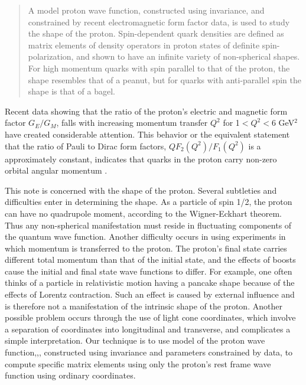 \maketitle
\begin{abstract}
A model proton wave function, constructed using \poinc invariance, and
constrained by recent electromagnetic form factor data, is used to study
the shape of the proton. Spin-dependent quark densities are defined as
matrix elements of density operators in 
proton states of definite spin-polarization, and shown to have 
an infinite 
variety of non-spherical shapes. For high momentum quarks with spin parallel
to that of the proton, the shape resembles that of a peanut,
but  for quarks with anti-parallel spin the shape is that of a bagel.
\end{abstract}

\vskip0.5cm

Recent data \cite {Jones:1999rz,Gayou:2001qd} 
showing that  the ratio of the proton's electric and magnetic form
factor $G_E/G_M$, falls with increasing momentum transfer $Q^2$ for 
1$<Q^2<6 $ GeV$^2$
have created considerable attention. This behavior  or the equivalent    
statement 
 that  the ratio of Pauli
to Dirac form factors, $QF_2(Q^2)/F_1(Q^2)$ is a approximately constant,
indicates that quarks in the proton carry non-zero orbital angular momentum
\cite{ralston,Braun:2001tj,Miller:2002qb,Ji}.

This note is concerned with 
the shape of the proton. 
Several   subtleties and difficulties enter in determining the shape.
 As a particle of spin
1/2, the proton can have no quadrupole moment, 
according to the Wigner-Eckhart theorem.  Thus any non-spherical 
manifestation must reside in fluctuating components of the quantum wave
function. Another difficulty occurs in using experiments
in which momentum is transferred to the proton. The proton's final state  
 carries different total momentum than that of the initial
state, and the effects of boosts cause the initial and final state
wave functions to differ. For example, one often thinks  of a particle
in relativistic motion having a pancake shape because of the effects
of Lorentz contraction. Such an effect is caused by external influence
and is therefore not a manifestation of the intrinsic shape
of the proton. Another possible problem occurs through the use of 
light cone coordinates, which
  involve a separation of coordinates into
longitudinal and transverse, and  complicates   a simple interpretation. Our
technique is to use   model of the 
proton wave 
function\cite{Frank:1995pv},\cite{Miller:2002qb},\cite{Miller:2002ig}, 
constructed using \poinc invariance and  parameters
constrained by data, to compute
specific matrix elements using only the proton's rest  frame wave function 
using ordinary coordinates.


